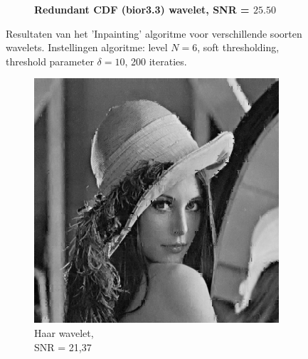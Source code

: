 \begin{figure}
\begin{subfigure}[b]{0.4\textwidth}
        \caption{\textbf{ Redundant CDF (bior3.3) wavelet, SNR = $\mathbf{25.50}$} }
        \label{fig:matti_fig_rwt_bior33}
    \end{subfigure}
    \caption{Resultaten van het 'Inpainting' algoritme voor verschillende soorten wavelets. Instellingen algoritme: level $N = 6$, soft thresholding, threshold parameter $\delta = 10$, 200 iteraties.}\label{fig:matti_fig_rwt}
\end{figure}


\begin{figure}
    \centering
    \begin{subfigure}[b]{0.4\textwidth}
        \includegraphics[width=\textwidth]{../src/inpainting/vraag_2_4_haar}
        \caption{Haar wavelet, \\ SNR = 21,37 }
        \label{fig:matti_fig_haar}
    \end{subfigure}
    ~ %
    \begin{subfigure}[b]{0.4\textwidth}

\end{subfigure}
\end{figure}
